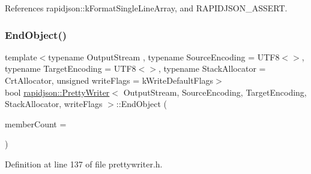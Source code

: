 References rapidjson\+::k\+Format\+Single\+Line\+Array, and R\+A\+P\+I\+D\+J\+S\+O\+N\+\_\+\+A\+S\+S\+E\+RT.

\mbox{\label{classrapidjson_1_1_pretty_writer_ab53444ec4b12be2152bd712c24ec5193}} 
\subsubsection{\texorpdfstring{EndObject()}{EndObject()}}
{\footnotesize\ttfamily template$<$typename Output\+Stream , typename Source\+Encoding  = U\+T\+F8$<$$>$, typename Target\+Encoding  = U\+T\+F8$<$$>$, typename Stack\+Allocator  = Crt\+Allocator, unsigned write\+Flags = k\+Write\+Default\+Flags$>$ \\
bool \mbox{\hyperlink{classrapidjson_1_1_pretty_writer}{rapidjson\+::\+Pretty\+Writer}}$<$ Output\+Stream, Source\+Encoding, Target\+Encoding, Stack\+Allocator, write\+Flags $>$\+::End\+Object (\begin{DoxyParamCaption}\item[{\mbox{\hyperlink{namespacerapidjson_a44eb33eaa523e36d466b1ced64b85c84}{Size\+Type}}}]{member\+Count = {} }\end{DoxyParamCaption})}



Definition at line 137 of file prettywriter.\+h.


